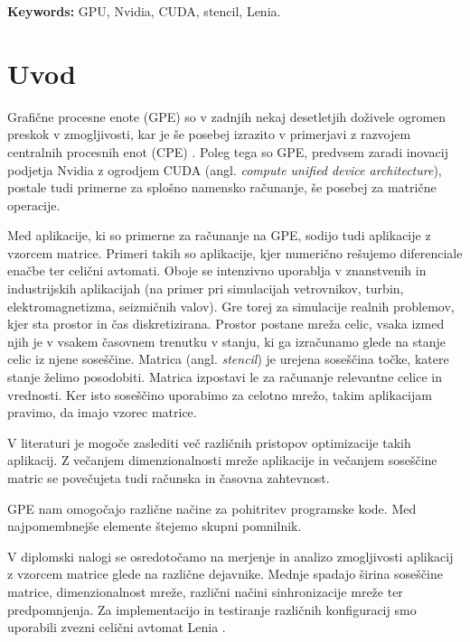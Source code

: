 \documentclass[a4paper, 12pt, openright]{book}
\newcommand{\tkeywordsEn}{GPU, Nvidia, CUDA, stencil, Lenia}
\newcommand{\clearemptydoublepage}{\newpage{\pagestyle{empty}\cleardoublepage}}
\begin{document}
\noindent\textbf{Keywords:} \tkeywordsEn.
\clearemptydoublepage

\mainmatter
\setcounter{page}{1}
\pagestyle{fancy}

\chapter{Uvod}

Grafične procesne enote (GPE) so v zadnjih nekaj desetletjih doživele ogromen preskok v zmogljivosti, kar je še posebej izrazito v primerjavi z razvojem centralnih procesnih enot (CPE) \cite{Surina_2009}.
Poleg tega so GPE, predvsem zaradi inovacij podjetja Nvidia z ogrodjem CUDA (angl. \textit{compute unified device architecture}), postale tudi primerne za splošno namensko računanje, še posebej za matrične operacije.

Med aplikacije, ki so primerne za računanje na GPE, sodijo tudi aplikacije z vzorcem matrice.
Primeri takih so aplikacije, kjer numerično rešujemo diferenciale enačbe ter celični avtomati.
Oboje se intenzivno uporablja v znanstvenih in industrijskih aplikacijah (na primer pri  simulacijah vetrovnikov, turbin, elektromagnetizma, seizmičnih valov).
Gre torej za simulacije realnih problemov, kjer sta prostor in čas diskretizirana.
Prostor postane mreža celic, vsaka izmed njih je v vsakem časovnem trenutku v stanju, ki ga izračunamo glede na stanje celic iz njene soseščine.
Matrica (angl. \textit{stencil}) je urejena soseščina točke, katere stanje želimo posodobiti. Matrica izpostavi le za računanje relevantne celice in vrednosti. Ker isto soseščino uporabimo za celotno mrežo, takim aplikacijam pravimo, da imajo vzorec matrice.

V literaturi \cite{anjum2022efficient, 10.1145/1513895.1513905, SCHAFER20112027} je mogoče zaslediti več različnih pristopov optimizacije takih aplikacij.
Z večanjem dimenzionalnosti mreže aplikacije in večanjem soseščine matric se povečujeta tudi računska in časovna zahtevnost.

GPE nam omogočajo različne načine za pohitritev programske kode. Med najpomembnejše elemente štejemo skupni pomnilnik.

V diplomski nalogi se osredotočamo na merjenje in analizo zmogljivosti aplikacij z vzorcem matrice glede na različne dejavnike.
Mednje spadajo širina soseščine matrice, dimenzionalnost mreže, različni načini sinhronizacije mreže ter predpomnjenja.
Za implementacijo in testiranje različnih konfiguracij smo uporabili zvezni celični avtomat Lenia \cite{lenia_expanded, lenia}.
\end{document}
